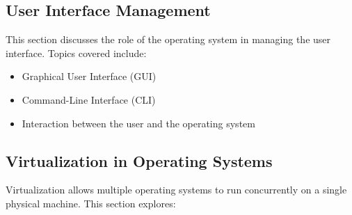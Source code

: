 \documentclass[12pt]{article}
\begin{document}
\subsection{User Interface Management}
This section discusses the role of the operating system in managing the user interface. Topics covered include:
\begin{itemize}
    \item Graphical User Interface (GUI)
    \item Command-Line Interface (CLI)
    \item Interaction between the user and the operating system
\end{itemize}

\subsection{Virtualization in Operating Systems}
Virtualization allows multiple operating systems to run concurrently on a single physical machine. This section explores:
\end{document}
